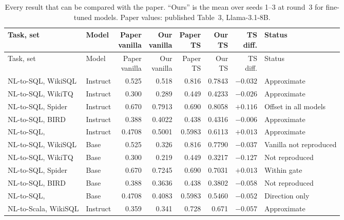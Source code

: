 {\small
{}
\begin{longtable}{@{}p{2.6cm}p{1.5cm}rrrrrp{2.8cm}@{}}
\caption{Every result that can be compared with the paper. ``Ours'' is the mean over seeds 1--3 at round~3 for
fine-tuned models. Paper values: published Table~3, Llama-3.1-8B.}\label{tab:perf-compare}\\
\toprule\rowcolor{headshade}Task, set & Model & \makecell{Paper\\vanilla} & \makecell{Our\\vanilla} &
\makecell{Paper\\TS} & \makecell{Our\\TS} & \makecell{TS\\diff.} & Status\\\midrule\endfirsthead
\toprule\rowcolor{headshade}Task, set & Model & \makecell{Paper\\vanilla} & \makecell{Our\\vanilla} &
\makecell{Paper\\TS} & \makecell{Our\\TS} & \makecell{TS\\diff.} & Status\\\midrule\endhead
\bottomrule\endfoot
NL-to-SQL, WikiSQL & Instruct & 0.525 & 0.518 & 0.816 & 0.7843 & $-0.032$ & Approximate\\
NL-to-SQL, WikiTQ & Instruct & 0.300 & 0.289 & 0.449 & 0.4233 & $-0.026$ & Approximate\\
NL-to-SQL, Spider & Instruct & 0.670 & 0.7913 & 0.690 & 0.8058 & $+0.116$ & Offset in all models\\
NL-to-SQL, BIRD & Instruct & 0.388 & 0.4022 & 0.438 & 0.4316 & $-0.006$ & Approximate\\
NL-to-SQL, \ZSiv{} & Instruct & 0.4708 & 0.5001 & 0.5983 & 0.6113 & $+0.013$ & Approximate\\
NL-to-SQL, WikiSQL & Base & 0.525 & 0.326 & 0.816 & 0.7790 & $-0.037$ & Vanilla not reproduced\\
NL-to-SQL, WikiTQ & Base & 0.300 & 0.219 & 0.449 & 0.3217 & $-0.127$ & Not reproduced\\
NL-to-SQL, Spider & Base & 0.670 & 0.7245 & 0.690 & 0.7031 & $+0.013$ & Within gate\\
NL-to-SQL, BIRD & Base & 0.388 & 0.3636 & 0.438 & 0.3802 & $-0.058$ & Not reproduced\\
NL-to-SQL, \ZSiv{} & Base & 0.4708 & 0.4083 & 0.5983 & 0.5460 & $-0.052$ & Direction only\\
NL-to-Scala, WikiSQL & Instruct & 0.359 & 0.341 & 0.728 & 0.671 & $-0.057$ & Approximate

\end{longtable}}
